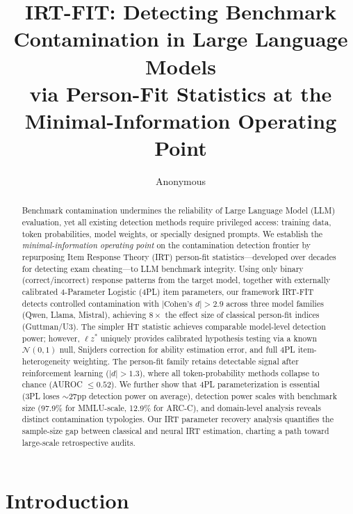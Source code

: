 \documentclass[11pt,twocolumn]{article}
\title{IRT-FIT: Detecting Benchmark Contamination in Large Language Models\\via Person-Fit Statistics at the Minimal-Information Operating Point}
\author{Anonymous}
\date{}
\newcommand{\lzs}{\ensuremath{\ell z^*}}
\begin{document}
\maketitle

\begin{abstract}
Benchmark contamination undermines the reliability of Large Language Model (LLM) evaluation, yet all existing detection methods require privileged access: training data, token probabilities, model weights, or specially designed prompts. We establish the \emph{minimal-information operating point} on the contamination detection frontier by repurposing Item Response Theory (IRT) person-fit statistics---developed over decades for detecting exam cheating---to LLM benchmark integrity. Using only binary (correct/incorrect) response patterns from the target model, together with externally calibrated 4-Parameter Logistic (4PL) item parameters, our framework IRT-FIT detects controlled contamination with $|\text{Cohen's } d| > 2.9$ across three model families (Qwen, Llama, Mistral), achieving $8\times$ the effect size of classical person-fit indices (Guttman/U3). The simpler HT statistic achieves comparable model-level detection power; however, $\lzs$ uniquely provides calibrated hypothesis testing via a known $\mathcal{N}(0,1)$ null, Snijders correction for ability estimation error, and full 4PL item-heterogeneity weighting. The person-fit family retains detectable signal after reinforcement learning ($|d| > 1.3$), where all token-probability methods collapse to chance (AUROC $\leq 0.52$). We further show that 4PL parameterization is essential (3PL loses ${\sim}27$pp detection power on average), detection power scales with benchmark size (97.9\% for MMLU-scale, 12.9\% for ARC-C), and domain-level analysis reveals distinct contamination typologies. Our IRT parameter recovery analysis quantifies the sample-size gap between classical and neural IRT estimation, charting a path toward large-scale retrospective audits.
\end{abstract}

\section{Introduction}
\end{document}
